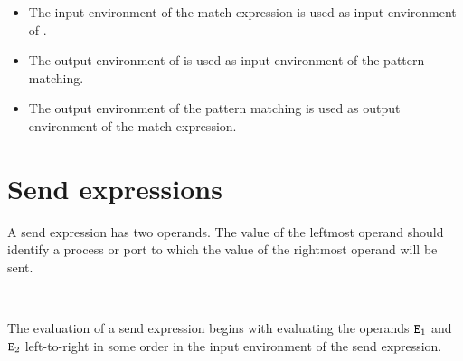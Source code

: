 \ENVIRONMENTS

\begin{itemize}
\item The input environment of the match expression is used as input environment of .
\item The output environment of  is used as input environment of the pattern matching.
\item The output environment of the pattern matching is used as output environment of
the match expression.
\end{itemize}

\iffalse
A match expression has only one proper subexpression so it is not meaningful to
talk about an order of evaluation.  However, note that in an expression
\begin{alltt}
\(\Z{P}\sb{1}\) = \(\Z{P}\sb{2}\) = \(\cdots\) = \(\Z{P}\sb{k}\) ! \Z{E}
\end{alltt}
matching against pattern $\TZ{P}_i$ will be completed before
matching against pattern $\TZ{P}_{i-1}$ begins and variables
having their binding occurrence in pattern $\TZ{P}_i$ can have
applied occurrences in pattern $\TZ{P}_{i-1}$.
\fi
{}

\section{Send expressions}

\label{section:send-expr}

A send expression has two operands. The value of the leftmost operand
should identify a process or port to which the value of the rightmost
operand will be sent.

\SYNTAX

\begin{rules}
       { \TXT{!}\  \OR
        }
\end{rules}

\EVALUATION

The evaluation of a send expression  begins
with evaluating the operands ${\tt{\sl E}}_1$ and ${\tt{\sl E}}_2$
\ifStd left-to-right \fi \ifOld in some order \fi
in the input environment of the send expression.

